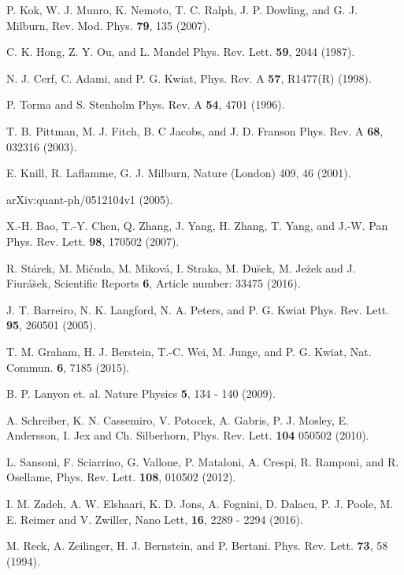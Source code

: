 \documentclass[aps,pra,twocolumn,showpacs,superscriptaddress,floatfix,10pt]{revtex4}
\begin{document}
\begin{thebibliography}{99}
	
  P. Kok, W. J. Munro,   K.   Nemoto,   T. C.   Ralph,   J. P.
Dowling, and G. J. Milburn, Rev. Mod. Phys. {\bf 79}, 135 (2007).

 C. K. Hong, Z. Y. Ou, and L. Mandel Phys. Rev. Lett. {\bf 59}, 2044 (1987).

 N. J. Cerf, C. Adami, and P. G. Kwiat, Phys. Rev. A {\bf 57}, R1477(R) (1998).

 P. Torma and S. Stenholm Phys. Rev. A {\bf 54}, 4701 (1996).

 T. B. Pittman, M. J. Fitch, B. C Jacobs, and J. D. Franson
Phys. Rev. A {\bf 68}, 032316 (2003).

  E. Knill, R. Laflamme, G. J. Milburn, Nature (London) 409, 46 (2001).

 arXiv:quant-ph/0512104v1 (2005).

 X.-H. Bao, T.-Y. Chen, Q. Zhang, J. Yang, H. Zhang, T. Yang, and J.-W. Pan
Phys. Rev. Lett. {\bf 98}, 170502 (2007).

 R. St\'{a}rek, M. Mi\v{c}uda, M. Mikov\'{a}, I. Straka, M. Du\u{s}ek, M. Je\u{z}ek and J. Fiur\'{a}\u{s}ek, Scientific Reports { \bf 6}, Article number: 33475 (2016).

 J. T. Barreiro, N. K. Langford, N. A. Peters, and P. G. Kwiat
Phys. Rev. Lett. {\bf 95}, 260501 (2005).

 T. M. Graham, H. J. Berstein, T.-C. Wei, M. Junge, and P. G. Kwiat, Nat. Commun. {\bf 6}, 7185 (2015).

 B. P. Lanyon et. al. Nature Physics {\bf 5}, 134 - 140 (2009).

 A. Schreiber, K. N. Cassemiro, V. Potocek, A. Gabris, P. J. Mosley, E. Andersson, I. Jex and Ch. Silberhorn, Phys. Rev. Lett.{ \bf 104 }050502 (2010).

 L. Sansoni, F. Sciarrino, G. Vallone, P. Mataloni, A. Crespi, R. Ramponi, and R. Osellame, Phys. Rev. Lett. {\bf 108}, 010502 (2012).

 I. M. Zadeh, A. W. Elshaari, K. D. Jons, A. Fognini, D. Dalacu, P. J. Poole, M. E. Reimer and V. Zwiller, Nano Lett, {\bf 16}, 2289 - 2294 (2016).

 M. Reck, A. Zeilinger, H. J. Bernstein, and P. Bertani. Phys. Rev. Lett. {\bf 73}, 58 (1994).


\end{thebibliography}
\end{document}
